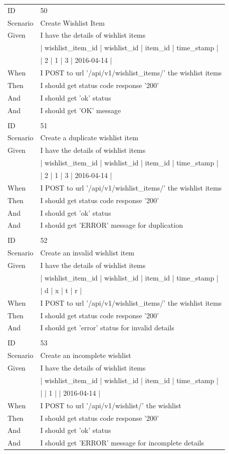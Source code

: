 \documentclass{report}
\begin{document}
\begin{tabular}{ l l }
ID 			& 50\\
Scenario		& Create Wishlist Item \\
Given 		& I have the details of wishlist items\\
    			& | wishlist\_item\_id | wishlist\_id | item\_id | time\_stamp |\\
    			& | 2 | 1 | 3 | 2016-04-14 | \\
When 		& I POST to url '/api/v1/wishlist\_items/' the wishlist items \\
Then 		& I should get status code response '200' \\
And 			& I should get 'ok' status \\
And 			& I should get 'OK' message\\ \\
ID 			& 51\\
Scenario		& Create a duplicate wishlist item \\
Given 		& I have the details of wishlist items\\
    			& | wishlist\_item\_id | wishlist\_id | item\_id | time\_stamp | \\
    			& | 2 | 1 | 3 | 2016-04-14 | \\
When 		& I POST to url '/api/v1/wishlist\_items/' the wishlist items \\
Then 		& I should get status code response '200' \\
And 			& I should get 'ok' status \\
And 			& I should get 'ERROR' message for duplication \\ \\
ID 			& 52\\
Scenario		& Create an invalid wishlist item \\
Given 		& I have the details of wishlist items \\
   			& | wishlist\_item\_id | wishlist\_id | item\_id | time\_stamp | \\
    			& | d | x | t | r | \\
When 		& I POST to url '/api/v1/wishlist\_items/' the wishlist items \\
Then 		& I should get status code response '200' \\
And 			& I should get 'error' status for invalid details \\ \\
ID 			& 53\\
Scenario		& Create an incomplete wishlist \\
Given 		& I have the details of wishlist items\\
    			& | wishlist\_item\_id | wishlist\_id | item\_id | time\_stamp |\\
    			& |  | 1 |  | 2016-04-14 | \\
When 		& I POST to url '/api/v1/wishlist/' the wishlist \\
Then 		& I should get status code response '200' \\
And 			& I should get 'ok' status \\
And 			& I should get 'ERROR' message for incomplete details \\
\end{tabular}
\newpage
\end{document}
